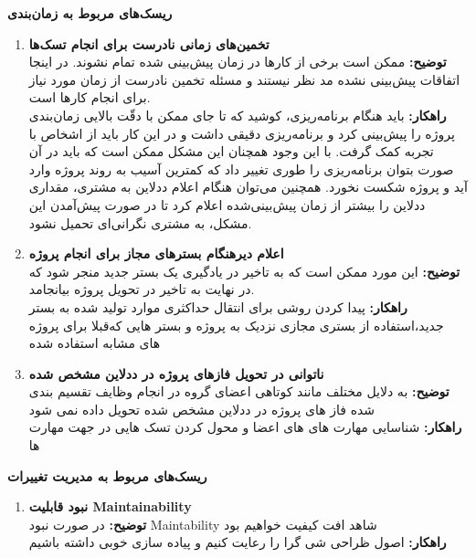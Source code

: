 \large \textbf{ریسک‌های مربوط به زمان‌بندی}
\begin{enumerate}[start = 11] 
    \item \textbf{تخمین‌های زمانی نادرست برای انجام تسک‌ها}
       \\\textbf{توضیح: }
        ممکن است برخی  از کارها در زمان پیش‌بینی شده تمام نشوند. در اینجا اتفاقات پیش‌بینی نشده مد نظر نیستند و مسئله تخمین نادرست از زمان مورد نیاز برای انجام کارها است.
       \\\textbf{راهکار: }
        باید هنگام برنامه‌ریزی، کوشید که تا جای ممکن با دقّت بالایی زمان‌بندی پروژه را پیش‌بینی کرد و برنامه‌ریزی دقیقی داشت و در این کار باید از اشخاص با تجربه کمک گرفت. با این وجود همچنان این مشکل ممکن است که باید در آن صورت بتوان برنامه‌ریزی را طوری تغییر داد که کمترین آسیب به روند پروژه وارد آید و پروژه شکست نخورد. همچنین می‌توان هنگام اعلام ددلاین به مشتری، مقداری ددلاین را بیشتر از زمان پیش‌بینی‌شده اعلام کرد تا در صورت پیش‌آمدن این مشکل، به مشتری نگرانی‌ای تحمیل نشود.
    \item \textbf{اعلام دیرهنگام بسترهای مجاز برای انجام پروژه}
       \\\textbf{توضیح: }
        این مورد ممکن است که به تاخیر در یادگیری یک بستر جدید منجر شود که  
        در نهایت به تاخیر در تحویل پروژه بیانجامد.    
       \\\textbf{راهکار: }
        پیدا کردن روشی برای انتقال حداکثری موارد تولید شده به بستر جدید،استفاده از بستری مجازی  نزدیک به  پروژه و   بستر هایی که‌قبلا برای پروژه های مشابه استفاده شده
    \item \textbf{ناتوانی در تحویل فازهای پروژه در ددلاین مشخص شده}
       \\\textbf{توضیح: }
        به دلایل مختلف مانند کوتاهی اعضای گروه در انجام وظایف تقسیم بندی شده فاز های پروژه در ددلاین مشخص شده تحویل داده نمی شود
       \\\textbf{راهکار: }
        شناسایی  مهارت های های اعضا و محول کردن تسک هایی در جهت مهارت ها 
\end{enumerate}

\large \textbf{ریسک‌های مربوط به مدیریت تغییرات}
\begin{enumerate}[start = 14] 

    \item \textbf{نبود قابلیت Maintainability }
       \\\textbf{توضیح: }
        در صورت نبود Maintability شاهد افت کیفیت خواهیم بود
        \\\textbf{راهکار: }
        اصول ظراحی شی گرا را رعایت کنیم و پیاده سازی خوبی داشته باشیم
    \end{enumerate}

